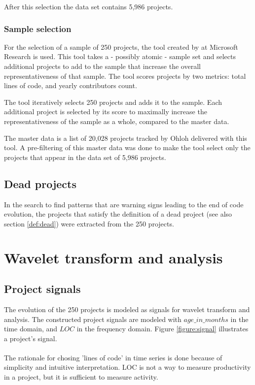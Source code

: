 After this selection the data set contains 5,986 projects.

\subsubsection{Sample selection}
For the selection of a sample of 250 projects, the tool created by
\citet{nagappan} at Microsoft Research is used. This tool takes a - possibly
atomic - sample set and selects additional projects to add to the sample that
increase the overall representativeness of that sample. The tool scores
projects by two metrics: total lines of code, and yearly contributors count.

The tool iteratively selects 250 projects and adds it to the sample. Each
additional project is selected by its score to maximally increase the
representativeness of the sample as a whole, compared to the master data.

The master data is a list of 20,028 projects tracked by Ohloh delivered with
this tool. A pre-filtering of this master data was done to make the tool select
only the projects that appear in the data set of 5,986 projects.

\subsection{Dead projects}
In the search to find patterns that are warning signs leading to the end of
code evolution, the projects that satisfy the definition of a dead project (see
also section \ref{def:dead}) were extracted from the 250 projects.

\section{Wavelet transform and analysis}
\subsection{Project signals}
\label{section:signals}
The evolution of the 250 projects is modeled as signals for wavelet transform
and analysis. The constructed project signals are modeled with
$age\_in\_months$ in the time domain, and $LOC$ in the frequency domain. Figure
\ref{figure:signal} illustrates a project's signal.



\paragraph{}
The rationale for chosing 'lines of code' in time series is done because of
simplicity and intuitive interpretation. LOC is not a way to measure
productivity in a project, but it is sufficient to measure activity.

